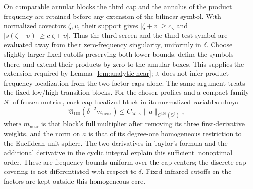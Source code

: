 \documentclass[11pt,a4paper]{article}
\numberwithin{equation}{section}
\theoremstyle{definition}
\begin{document}
On comparable annular blocks the third cap and the annulus of the product frequency
are retained before any extension of the bilinear symbol. With
normalized covectors $\zeta,\upsilon$, their support gives
$|\zeta+\upsilon|\geq c_\kappa$ and
$|s(\zeta+\upsilon)|\geq c|\zeta+\upsilon|$. Thus the third screen
and the third test symbol are evaluated away from their zero-frequency
singularity, uniformly in $\delta$. Choose slightly larger fixed
cutoffs preserving both lower bounds, define the symbols there, and
extend their products by zero to the annular boxes. This supplies
the extension required by Lemma~\ref{lem:analytic-near}; it does not
infer product-frequency localization from the two factor caps alone. The same
argument treats the fixed low/high transition blocks.
For the chosen profiles and a compact family $\mathcal K$ of frozen
metrics, each cap-localized block in its normalized variables obeys
\begin{equation*}
\mathfrak A_{100}(\delta^{-2}m_{\mathrm{near}})
\leq C_{\mathcal K,\kappa}\|a\|_{C^{103}(\mathbb S^3)},
\end{equation*}
where $m_{\mathrm{near}}$ is that block's full multiplier after removing
its three first-derivative weights, and the norm on $a$ is that of its
degree-one homogeneous restriction to the Euclidean unit sphere.
The two derivatives in Taylor's formula and the additional derivative
in the cyclic integral explain this sufficient, nonoptimal order.
These are frequency bounds uniform over the cap centers; the discrete
cap covering is not differentiated with respect to $\delta$.
Fixed infrared cutoffs on the factors are kept outside this homogeneous core.
\end{document}
